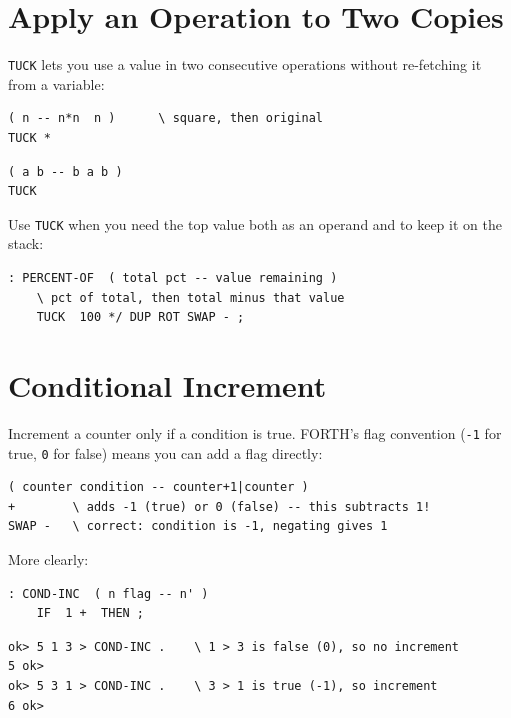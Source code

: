 \section{Apply an Operation to Two Copies}
\label{sec:idiom-tuck}

\texttt{TUCK} lets you use a value in two consecutive operations without
re-fetching it from a variable:

\begin{lstlisting}[language=Forth]
( n -- n*n  n )      \ square, then original
TUCK *
\end{lstlisting}

\begin{lstlisting}[language=Forth]
( a b -- b a b )
TUCK
\end{lstlisting}

Use \texttt{TUCK} when you need the top value both as an operand and to keep it
on the stack:

\begin{lstlisting}[language=Forth]
: PERCENT-OF  ( total pct -- value remaining )
    \ pct of total, then total minus that value
    TUCK  100 */ DUP ROT SWAP - ;
\end{lstlisting}

\section{Conditional Increment}
\label{sec:idiom-cond-inc}

Increment a counter only if a condition is true. FORTH's flag convention
(\texttt{-1} for true, \texttt{0} for false) means you can add a flag
directly:

\begin{lstlisting}[language=Forth]
( counter condition -- counter+1|counter )
+        \ adds -1 (true) or 0 (false) -- this subtracts 1!
SWAP -   \ correct: condition is -1, negating gives 1
\end{lstlisting}

More clearly:

\begin{lstlisting}[language=Forth]
: COND-INC  ( n flag -- n' )
    IF  1 +  THEN ;
\end{lstlisting}

\begin{lstlisting}[language=Forth]
ok> 5 1 3 > COND-INC .    \ 1 > 3 is false (0), so no increment
5 ok>
ok> 5 3 1 > COND-INC .    \ 3 > 1 is true (-1), so increment
6 ok>
\end{lstlisting}

